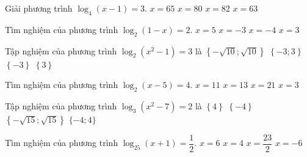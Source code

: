 \begin{ex}
	Giải phương trình $\log_4(x-1)=3$.
	\choice
	{\True $x=65$}
	{$x=80$}
	{$x=82$}
	{$x=63$}
\end{ex}
\begin{ex}
	[Mã 110 2017]%
	Tìm nghiệm của phương trình $\log_2\left(1-x\right)=2$.
	\choice
	{$x=5$}
	{\True $x=-3$}
	{$x=-4$}
	{$x=3$}
\end{ex}
\begin{ex}
	[Mã 102 2018]%
	Tập nghiệm của phương trình $\log_2\left(x^2-1\right)=3$ là
	\choice
	{$\left\{-\sqrt{10};\sqrt{10}\right\}$}
	{\True $\left\{-3;3\right\}$}
	{$\left\{-3\right\}$}
	{$\left\{3\right\}$}
\end{ex}
\begin{ex}
	[Mã 104 2017]%
	Tìm nghiệm của phương trình $\log_2\left(x-5\right)=4$.
	\choice
	{$x=11$}
	{$x=13$}
	{\True $x=21$}
	{$x=3$}
\end{ex}
\begin{ex}
	[Mã 103 2018]%
	Tập nghiệm của phương trình $\log_3(x^2-7)=2$ là
	\choice
	{$\left\{ 4\right\}$}
	{$\left\{-4\right\}$}
	{$\left\{-\sqrt{15};\sqrt{15}\right\}$}
	{\True $\{-4;4\}$}
	\loigiai{
		$\log_3(x^2-7)=2$$\Leftrightarrow{x^2}-7=9$$\Leftrightarrow\left[\begin{aligned}
			& x=4\\ 
			& x=-4\\ 
		\end{aligned}\right.$.
	}
\end{ex}
\begin{ex}
	[Mã 105 2017]%
	Tìm nghiệm của phương trình $\log_{25}\left(x+1\right)=\dfrac{1}{2}$.
	\choice
	{$x=6$}
	{\True $x=4$}
	{$x=\dfrac{23}{2}$}
	{$x=-6$}
\end{ex}
